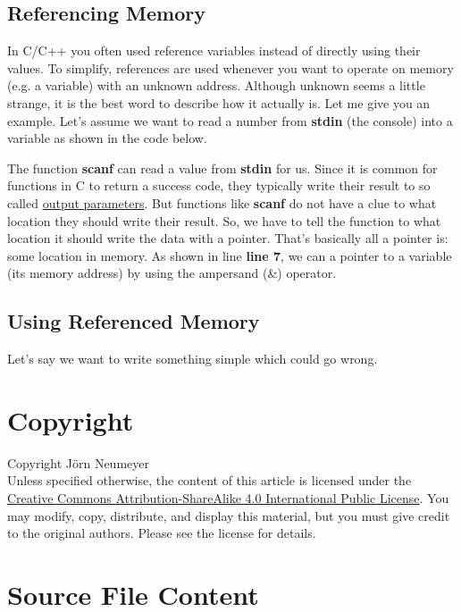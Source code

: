 \documentclass{article}
\begin{document}
  \subsection{Referencing Memory}
  In C/C++ you often used reference variables instead of directly using their values.
  To simplify, references are used whenever you want to operate on memory (e.g. a variable) with an unknown address.
  Although unknown seems a little strange, it is the best word to describe how it actually is.
  Let me give you an example.
  Let's assume we want to read a number from \textbf{stdin} (the console) into a variable as shown in the code below.
  
  The function \textbf{scanf} can read a value from \textbf{stdin} for us.
  Since it is common for functions in C to return a success code, they typically write their result to so called \underline{output parameters}.
  But functions like \textbf{scanf} do not have a clue to what location they should write their result.
  So, we have to tell the function to what location it should write the data with a pointer.
  That's basically all a pointer is: some location in memory.
  As shown in line \textbf{line 7}, we can a pointer to a variable (its memory address) by using the ampersand (\&) operator.
  \subsection{Using Referenced Memory}
  Let's say we want to write something simple which could go wrong.
  
  \section{Copyright}
  Copyright \textcopyright {} J\"orn Neumeyer\\
  Unless specified otherwise, the content of this article is licensed under the \href{https://creativecommons.org/licenses/by-sa/4.0/legalcode}{Creative Commons Attribution-ShareAlike 4.0 International Public License}.
  You may modify, copy, distribute, and display this material, but you must give credit to the original authors. Please see the license for details.
  \section{Source File Content}
  
\end{document}
